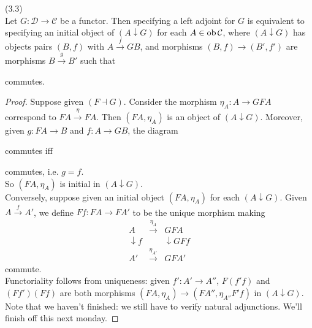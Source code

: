 \documentclass[a4paper]{article}
\begin{document}
\begin{thm} (3.3)\\
    Let $G:\mathcal{D} \to \mathcal{C}$ be a functor. Then specifying a left adjoint for $G$ is equivalent to specifying an initial object of $(A \downarrow G)$ for each $A \in \operatorname{ob} \mathcal{C}$, where $(A \downarrow G)$ has objects pairs $(B,f)$ with $A \xrightarrow{f} GB$, and morphisms $(B,f) \to (B',f')$ are morphisms $B \xrightarrow{g} B'$ such that 


    commutes.
    \begin{proof}
        Suppose given $(F \dashv G)$. Consider the morphism $\eta_A:A \to GFA$ correspond to $FA \xrightarrow{\eta} FA$. Then $(FA,\eta_A)$ is an object of $(A \downarrow G)$. Moreover, given $g:FA \to B$ and $f:A \to GB$, the diagram 


        commutes iff


        commutes, i.e. $g=\hat{f}$.\\
        So $(FA,\eta_A)$ is initial in $(A \downarrow G)$.\\
        Conversely, suppose given an initial object $(FA,\eta_A)$ for each $(A \downarrow G)$. Given $A \xrightarrow{f} A'$, we define $Ff : FA \to FA'$ to be the unique morphism making 
        \begin{equation*}
            \begin{aligned}
                A & \xrightarrow{\eta_A} & GFA\\
                \downarrow f & & \downarrow GFf\\
                A' & \xrightarrow{\eta_{A'}} & GFA'
            \end{aligned}
        \end{equation*}
        commute.\\
        Functoriality follows from uniqueness: given $f': A' \to A''$, $F(f'f)$ and $(Ff')(Ff)$ are both morphisms $(FA,\eta_A) \to (FA'',\eta_{A''}F'f)$ in $(A \downarrow G)$.\\
        Note that we haven't finished: we still have to verify natural adjunctions. We'll finish off this next monday. 


\end{proof}
\end{thm}
\end{document}
